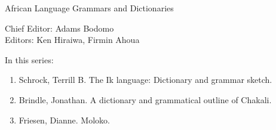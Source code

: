 {\large African Language Grammars and Dictionaries}

\bigskip

Chief Editor:    Adams Bodomo \\
Editors:    Ken Hiraiwa,    Firmin Ahoua

\bigskip

In this series:

\begin{enumerate}
\item Schrock, Terrill B. The Ik language: Dictionary and grammar sketch.
\item Brindle, Jonathan. A dictionary and grammatical outline of Chakali.
\item Friesen, Dianne. Moloko.
\end{enumerate}


\vfill

